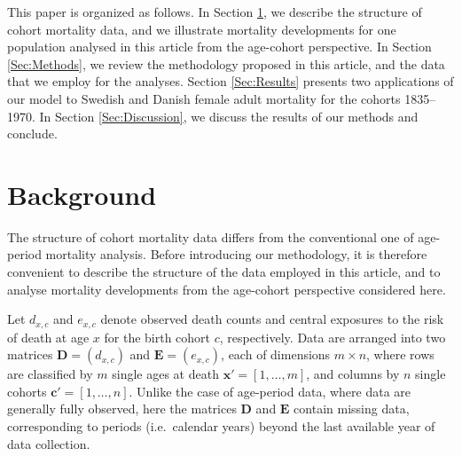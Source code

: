 \documentclass[11pt, a4paper]{article}
\begin{document}
This paper is organized as follows. {In \color{red}Section \ref{Sec:Background}, we describe the structure of cohort mortality data, and we illustrate mortality developments for one population analysed in this article from the age-cohort perspective.} In Section \ref{Sec:Methods}, we review the methodology proposed in this article, and the data that we employ for the analyses. Section \ref{Sec:Results} presents two applications of our model to Swedish and Danish female adult mortality for the cohorts 1835--1970. In Section \ref{Sec:Discussion}, we discuss the results of our methods and conclude. 

{\color{red}

\section{Background}
\label{Sec:Background}

The structure of cohort mortality data differs from the conventional one of age-period mortality analysis. Before introducing our methodology, it is therefore convenient to describe the structure of the data employed in this article, and to analyse mortality developments from the age-cohort perspective considered here.   

Let $d_{x,c}$ and $e_{x,c}$ denote observed death counts and central exposures to the risk of death at age $x$ for the birth cohort $c$, respectively. Data are arranged into two matrices $\bm{D} = (d_{x,c})$ and $\bm{E} = (e_{x,c})$, each of dimensions $m \times n$, where rows are classified by $m$ single ages at death $\bm{x}'=\left[1,\dots,m\right]$, and columns by $n$ single cohorts $\bm{c}'=\left[1,\dots,n\right]$. Unlike the case of age-period data, where data are generally fully observed, here the matrices $\bm{D}$ and $\bm{E}$ contain missing data, corresponding to periods (i.e.~calendar years) beyond the last available year of data collection. 

}
\end{document}

